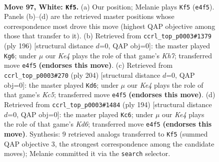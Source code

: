 \documentclass[11pt]{article}
\begin{document}
\clearpage

\begin{figure}[p]\centering
\begin{subfigure}{0.46\textwidth}\centering
\resizebox{\linewidth}{!}{%
\newchessgame
\chessboard[
  setfen={1Q6/7k/8/8/4K3/8/8/8 w - - 5 97},
  showmover=false,
  pgfstyle=straightmove, color=movearrow, markmove={e4-f5}
]}
\caption{}
\end{subfigure}\hfill
\begin{subfigure}{0.46\textwidth}\centering
\resizebox{\linewidth}{!}{%
\newchessgame
\chessboard[
  setfen={8/7K/4k3/1Q6/8/8/8/8 w - - 5 99},
  showmover=false,
  pgfstyle=straightmove, color=movearrow, markmove={h7-g6}
]}
\caption{}
\end{subfigure}
\\[4pt]
\begin{subfigure}{0.46\textwidth}\centering
\resizebox{\linewidth}{!}{%
\newchessgame
\chessboard[
  setfen={3k4/6Q1/8/2K5/8/8/8/8 w - - 7 103},
  showmover=false,
  pgfstyle=straightmove, color=movearrow, markmove={c5-d6}
]}
\caption{}
\end{subfigure}\hfill
\begin{subfigure}{0.46\textwidth}\centering
\resizebox{\linewidth}{!}{%
\newchessgame
\chessboard[
  setfen={1k6/8/3K4/Q7/8/8/8/8 w - - 9 98},
  showmover=false,
  pgfstyle=straightmove, color=movearrow, markmove={d6-c6}
]}
\caption{}
\end{subfigure}
\caption{\textbf{Move 97, White: \texttt{Kf5}.} (a) Our position; Melanie plays \texttt{Kf5} (\texttt{e4f5}). Panels (b)--(d) are the retrieved master positions whose correspondence most drove this move (highest QAP objective among those that transfer to it). (b) Retrieved from \texttt{ccrl\_top\_p0003\#1379} (ply 196) [structural distance $d$=0, QAP obj=0]: the master played \texttt{Kg6}; under $\mu$ our \emph{Ke4} plays the role of that game's \emph{Kh7}; transferred move \texttt{e4f5} \textbf{(endorses this move)}. (c) Retrieved from \texttt{ccrl\_top\_p0003\#270} (ply 204) [structural distance $d$=0, QAP obj=0]: the master played \texttt{Kd6}; under $\mu$ our \emph{Ke4} plays the role of that game's \emph{Kc5}; transferred move \texttt{e4f5} \textbf{(endorses this move)}. (d) Retrieved from \texttt{ccrl\_top\_p0003\#1484} (ply 194) [structural distance $d$=0, QAP obj=0]: the master played \texttt{Kc6}; under $\mu$ our \emph{Ke4} plays the role of that game's \emph{Kd6}; transferred move \texttt{e4f5} \textbf{(endorses this move)}. Synthesis: 9 retrieved analogs transferred to \texttt{Kf5} (summed QAP objective 3, the strongest correspondence among the candidate moves); Melanie committed it via the \texttt{search} selector.}
\label{fig:thought-m192}
\end{figure}
\end{document}
